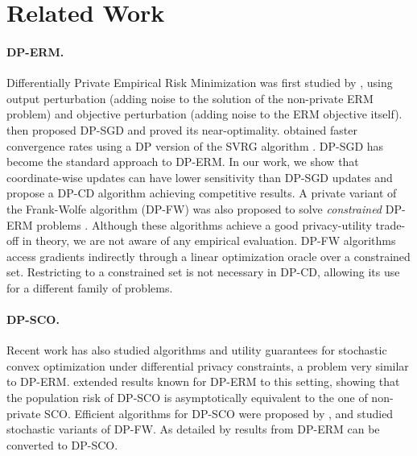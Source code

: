 
\section{Related Work}
\label{sec:related-works}



\paragraph{DP-ERM.}
Differentially Private Empirical Risk Minimization was first studied by
\citet{chaudhuri2011Differentially}, using output perturbation (adding noise
to the solution of the non-private ERM problem) and objective perturbation
(adding noise to the ERM objective itself).
\citet{bassily2014Private} then proposed DP-SGD and proved its
near-optimality. %
\citet{wang2017Differentially} obtained faster convergence rates using a
DP version of the SVRG algorithm
\citep{johnson2013Accelerating,xiao2014Proximal}.
DP-SGD has
become the standard approach to DP-ERM.
In our work, we show that coordinate-wise updates can have lower sensitivity
than DP-SGD updates and propose a DP-CD algorithm achieving competitive
results.
A private variant of the Frank-Wolfe algorithm (DP-FW) was also
proposed to solve \emph{constrained} DP-ERM problems
\citep{talwar2015Nearly}.  Although these algorithms achieve a good
privacy-utility trade-off in theory, we are not aware of any empirical
evaluation.
DP-FW algorithms access gradients indirectly through a linear
optimization oracle over a constrained set.
Restricting to a constrained set is not necessary in DP-CD, allowing its use for a different family of problems.

\paragraph{DP-SCO.} Recent work has also studied algorithms and
utility guarantees for
stochastic convex optimization under differential privacy constraints, a
problem very similar to DP-ERM. \citet{bassily2019Private} \citep[following work
from][]{hardt2016Train,bassily2020Stability} extended results known
for DP-ERM to this setting, showing that the population risk of DP-SCO
is asymptotically equivalent to the one of non-private SCO. Efficient
algorithms for
DP-SCO
were proposed by \citet{feldman2020Private,wang2022Differentially},
and \citet{asi2021Private,bassily2021NonEuclidean} studied stochastic
variants of DP-FW. As detailed by
\citet{dwork2015Preserving,bassily2016Algorithmic,jung2021New} results
from DP-ERM can be converted to DP-SCO.




